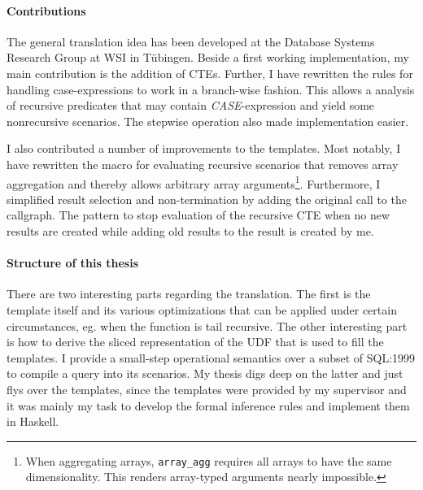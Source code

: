 \paragraph{Contributions} The general translation idea has been developed at the Database Systems Research Group at WSI in Tübingen. Beside a first working implementation, my main contribution is the addition of CTEs. Further, I have rewritten the rules for handling case-expressions to work in a branch-wise fashion. This allows a analysis of recursive predicates that may contain \textit{CASE}-expression and yield some nonrecursive scenarios. The stepwise operation also made implementation easier.

I also contributed a number of improvements to the templates. Most notably, I have rewritten the macro for evaluating recursive scenarios that removes array aggregation and thereby allows arbitrary array arguments\footnote{When aggregating arrays, \texttt{array\_agg} requires all arrays to have the same dimensionality. This renders array-typed arguments nearly impossible.}. Furthermore, I simplified result selection and non-termination by adding the original call to the callgraph. The pattern to stop evaluation of the recursive CTE when no new results are created while adding old results to the result is created by me.

\paragraph*{Structure of this thesis}
There are two interesting parts regarding the translation. The first is the template itself and its various optimizations that can be applied under certain circumstances, eg. when the function is tail recursive. The other interesting part is how to derive the sliced representation of the UDF that is used to fill the templates. I provide a small-step operational semantics over a subset of SQL:1999 to compile a query into its scenarios.
My thesis digs deep on the latter and just flys over the templates, since the templates were provided by my supervisor and it was mainly my task to develop the formal inference rules and implement them in Haskell.


